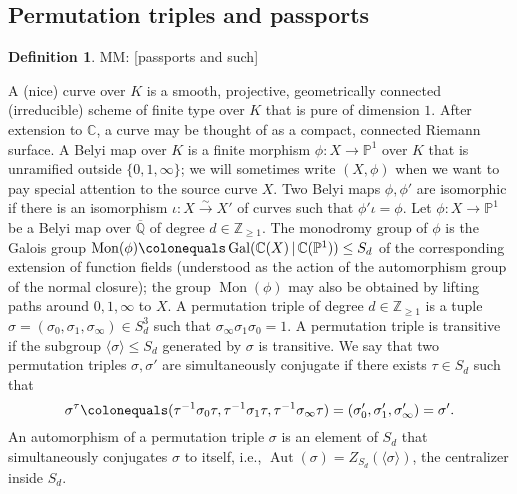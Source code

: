 \documentclass{dcthesis}
\newcommand{\PP}{\mathbb P}
\newcommand{\CC}{\mathbb C}
\newcommand{\QQ}{\mathbb Q}
\newcommand{\ZZ}{\mathbb Z}
\newcommand{\defi}[1]{\textsf{#1}}
\newcommand{\mm}[1]{{\color{blue} \sf MM: [#1]}}
\DeclareMathOperator{\Aut}{Aut}
\DeclareMathOperator{\Mon}{Mon}
\DeclareMathOperator{\Gal}{Gal}
\theoremstyle{definition}
\newtheorem{definition}[prop]{Definition}
\theoremstyle{remark}
\numberwithin{equation}{section}
\numberwithin{figure}{section}
\begin{document}
{{    \subsection{Permutation triples and passports}{\label{subsec:passports}
      \begin{definition}\label{def:passport}
        \mm{passports and such}
      \end{definition}
      A \defi{(nice) curve} over $K$ is
      a smooth, projective, geometrically connected (irreducible) scheme of finite
      type over $K$ that is pure of dimension $1$.
      After extension to $\CC$, a curve
      may be thought of as a compact, connected Riemann surface.  A \defi{Belyi map}
      over $K$ is a finite morphism $\phi\colon X \to \PP^1$ over $K$ that is
      unramified outside $\{0,1,\infty\}$; we will sometimes write $(X,\phi)$ when we
      want to pay special attention to the source curve $X$.  Two Belyi maps
      $\phi,\phi'$ are \defi{isomorphic} if there is an isomorphism $\iota\colon X
      \xrightarrow{\sim} X'$ of curves such that $\phi'\iota=\phi$.
      Let $\phi\colon X\to\PP^1$ be a Belyi map over $\overline{\QQ}$ of degree
      $d \in \ZZ_{\geq 1}$.
      The \defi{monodromy group} of $\phi$ is the Galois group
      $\Mon(\phi) \colonequals \Gal(\CC(X)\,|\,\CC(\PP^1)) \leq S_d$ of the
      corresponding extension of function fields (understood as the action of the
      automorphism group of the normal closure); the group $\Mon(\phi)$ may also be
      obtained by lifting paths around $0,1,\infty$ to $X$.
      A \defi{permutation triple} of degree $d \in \ZZ_{\geq 1}$ is a tuple $\sigma =
      (\sigma_0,\sigma_1,\sigma_\infty)\in S_d^3$ such that $\sigma_\infty \sigma_1
      \sigma_0 = 1$. A permutation triple is \defi{transitive} if the subgroup
      $\langle \sigma \rangle \leq S_d$ generated by $\sigma$ is transitive.  We say
      that two permutation triples $\sigma,\sigma'$ are \defi{simultaneously
      conjugate} if there exists $\tau\in S_d$ such that
      \begin{equation}\label{eqn:simconj}
        \sigma^\tau \colonequals
        (\tau^{-1}\sigma_0\tau, \tau^{-1}\sigma_1\tau, \tau^{-1}\sigma_\infty\tau)
        = \left(\sigma'_0,\sigma'_1,\sigma'_\infty\right)
        = \sigma'.
      \end{equation}
      An automorphism of a permutation triple $\sigma$ is an element of $S_d$ that
      simultaneously conjugates $\sigma$ to itself, i.e.,
      $\Aut(\sigma)=Z_{S_d}(\langle \sigma \rangle)$, the centralizer inside $S_d$.
}}}
\end{document}
